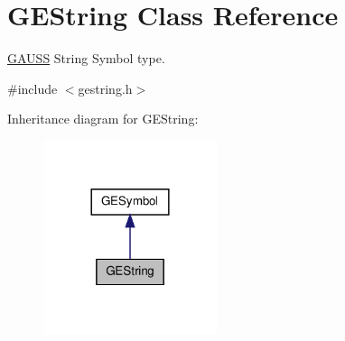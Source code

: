 \hypertarget{class_g_e_string}{\section{G\-E\-String Class Reference}
\label{class_g_e_string}
}


\hyperlink{class_g_a_u_s_s}{G\-A\-U\-S\-S} String Symbol type.  




{\ttfamily \#include $<$gestring.\-h$>$}



Inheritance diagram for G\-E\-String\-:\nopagebreak
\begin{figure}[H]
\begin{center}
\leavevmode
\includegraphics[width=144pt]{class_g_e_string__inherit__graph}
\end{center}
\end{figure}
